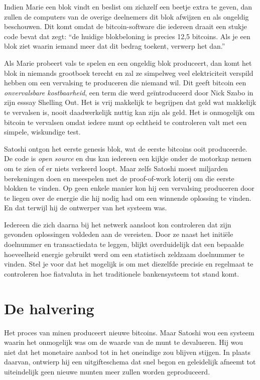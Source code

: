 \documentclass[
  letterpaper,
]{scrbook}
\begin{document}
Indien Marie een blok vindt en beslist om zichzelf een beetje extra te
geven, dan zullen de computers van de overige deelnemers dit blok
afwijzen en als ongeldig beschouwen. Dit komt omdat de bitcoin-software
die iedereen draait een stukje code bevat dat zegt: ``de huidige
blokbeloning is precies 12,5 bitcoins. Als je een blok ziet waarin
iemand meer dat dit bedrag toekent, verwerp het dan.''

Als Marie probeert vals te spelen en een ongeldig blok produceert, dan
komt het blok in niemands grootboek terecht en zal ze simpelweg veel
elektriciteit verspild hebben om een vervalsing te produceren die
niemand wil. Dit geeft bitcoin een \emph{onvervalsbare kostbaarheid},
een term die werd geïntroduceerd door Nick Szabo in zijn esssay Shelling
Out. Het is vrij makkelijk te begrijpen dat geld wat makkelijk te
vervalsen is, nooit daadwerkelijk nuttig kan zijn als geld. Het is
onmogelijk om bitcoin te vervalsen omdat iedere munt op echtheid te
controleren valt met een simpele, wiskundige test.

Satoshi ontgon het eerste genesis blok, wat de eerste bitcoins ooit
produceerde. De code is \emph{open source} en dus kan iedereen een
kijkje onder de motorkap nemen om te zien of er niets verkeerd loopt.
Maar zelfs Satoshi moest miljarden berekeningen doen en meespelen met de
proof-of-work loterij om die eerste blokken te vinden. Op geen enkele
manier kon hij een vervalsing produceren door te liegen over de energie
die hij nodig had om een winnende oplossing te vinden. En dat terwijl
hij de ontwerper van het systeem was.

Iedereen die zich daarna bij het netwerk aansloot kon controleren dat
zijn gevonden oplossingen voldeden aan de vereisten. Door ze naast het
initiële doelnummer en transactiedata te leggen, blijkt overduidelijk
dat een bepaalde hoeveelheid energie gebruikt werd om een statistisch
zeldzaam doelnummer te vinden. Stel je voor dat het mogelijk is om met
diezelfde precisie en regelmaat te controleren hoe fiatvaluta in het
traditionele bankensysteem tot stand komt.

\hypertarget{de-halvering}{%
\section{De halvering}\label{de-halvering}}

Het proces van minen produceert nieuwe bitcoins. Maar Satoshi wou een
systeem waarin het onmogelijk was om de waarde van de munt te
devalueren. Hij wou niet dat het monetaire aanbod tot in het oneindige
zou blijven stijgen. In plaats daarvan, ontwierp hij een uitgifteschema
dat snel begon en geleidelijk afneemt tot uiteindelijk geen nieuwe
munten meer zullen worden geproduceerd.
\end{document}
